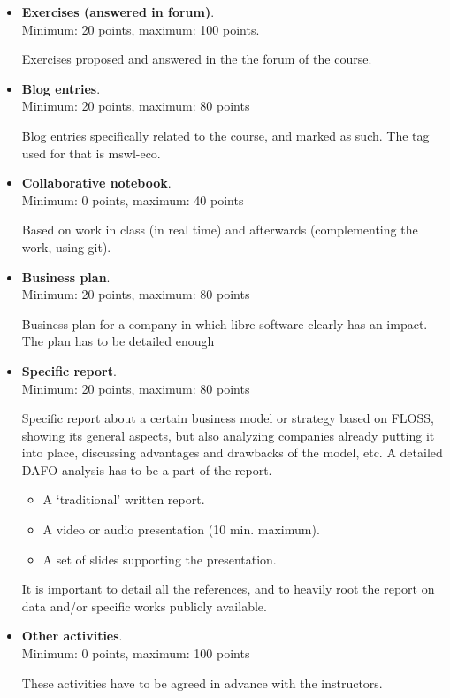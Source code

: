 \documentclass[a4paper]{article}
\begin{document}
\begin{itemize}
\item \textbf{Exercises (answered in forum)}. \\
  Minimum: 20 points, maximum: 100 points.

  Exercises proposed and answered in the the forum of the course.

\item \textbf{Blog entries}. \\
  Minimum: 20 points, maximum: 80 points

  Blog entries specifically related to the course, and marked as such. The tag used for that is mswl-eco.

\item \textbf{Collaborative notebook}. \\
  Minimum: 0 points, maximum: 40 points

  Based on work in class (in real time) and afterwards (complementing the work, using git).

\item \textbf{Business plan}. \\
  Minimum: 20 points, maximum: 80 points

  Business plan for a company in which libre software clearly has an impact. The plan has to be detailed enough

\item \textbf{Specific report}. \\
  Minimum: 20 points, maximum: 80 points

Specific report about a certain business model or strategy based on FLOSS, showing its general aspects, but also analyzing companies already putting it into place, discussing advantages and drawbacks of the model, etc. A detailed DAFO analysis has to be a part of the report.

\begin{itemize}
\item A `traditional' written report.
\item A video or audio presentation (10 min. maximum).
\item A set of slides supporting the presentation.
\end{itemize}

 It is important to detail all the references, and to heavily root the report on data and/or specific works publicly available.

\item \textbf{Other activities}. \\
  Minimum: 0 points, maximum: 100 points

  These activities have to be agreed in advance with the instructors.
\end{itemize}
\end{document}
